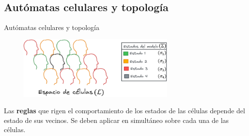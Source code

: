 \documentclass[9pt]{beamer}
\begin{document}
\subsection{Autómatas celulares y topología}
\begin{frame}{Autómatas celulares y topología}

\begin{figure}[h]
  \centering
    \includegraphics[width=0.7\textwidth]{Imagenes/espacioYEstados.png}
\end{figure}



Las \textbf{reglas} que rigen el comportamiento de los estados de las células depende del estado de sus vecinos. Se deben aplicar en simultáneo sobre cada una de las células.
\end{frame}
\end{document}
